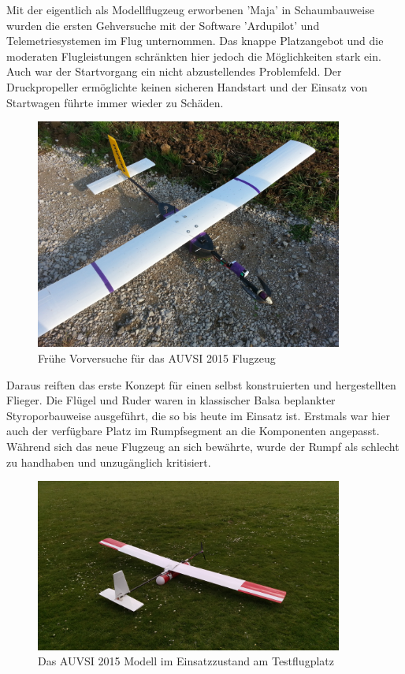Mit der eigentlich als Modellflugzeug erworbenen 'Maja' in Schaumbauweise wurden die ersten Gehversuche mit der Software 'Ardupilot' und Telemetriesystemen im Flug unternommen. Das knappe Platzangebot und die moderaten Flugleistungen schränkten hier jedoch die Möglichkeiten stark ein. Auch war der Startvorgang ein nicht abzustellendes Problemfeld. Der Druckpropeller ermöglichte keinen sicheren Handstart und der Einsatz von Startwagen führte immer wieder zu Schäden.

\begin{figure}[H]
\centering
\includegraphics[width=0.9\textwidth]{bilder/Fotos/AUVSI-MAYA-Hybrid.jpg} 
\caption{Frühe Vorversuche für das AUVSI 2015 Flugzeug} 
\label{Frühe Vorversuche für das AUVSI 2015 Flugzeug}
\end{figure}

Daraus reiften das erste Konzept für einen selbst konstruierten und hergestellten Flieger. Die Flügel und Ruder waren in klassischer Balsa beplankter Styroporbauweise ausgeführt, die so bis heute im Einsatz ist. Erstmals war hier auch der verfügbare Platz im Rumpfsegment an die Komponenten angepasst. Während sich das neue Flugzeug an sich bewährte, wurde der Rumpf als schlecht zu handhaben und unzugänglich kritisiert.

\begin{figure}[H]
\centering
\includegraphics[width=0.9\textwidth]{bilder/Fotos/AUVSI_2015.jpg} 
\caption{Das AUVSI 2015 Modell im Einsatzzustand am Testflugplatz} 
\label{Das AUVSI 2015 Modell in Einsatzzustand am Testflugplatz}
\end{figure}


